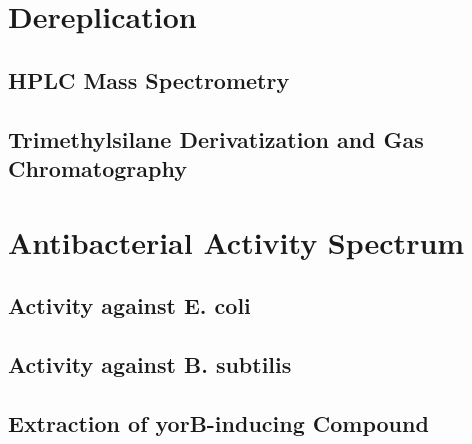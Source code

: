 

\section{Dereplication} %
\label{sec:dereplication}

    \subsection{HPLC Mass Spectrometry} %
    \label{sub:hplc_mass_spectrometry}


    \subsection{Trimethylsilane Derivatization and Gas Chromatography} %
    \label{sub:trimethylsilane_derivatization_and_gas_chromatography_results}



\section{Antibacterial Activity Spectrum} %
\label{sec:antibacterial_activity_spectrum}


    \subsection{Activity against E. coli} %
    \label{sub:activity_against_e_coli}


    \subsection{Activity against B. subtilis} %
    \label{sub:activity_against_b_subtilis}


    \subsection{Extraction of yorB-inducing Compound} %
    \label{sub:extraction_of_yorb_inducing_compound}

